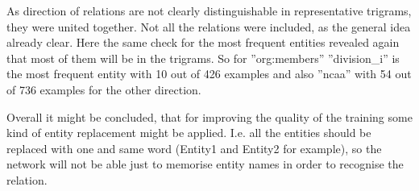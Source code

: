 As direction of relations are not clearly distinguishable in representative trigrams, they were 
united together. Not all the relations were included, as the general idea already clear. Here the same check for the most frequent entities revealed again that most of them will be in the trigrams. So for ''org:members'' ''division\_i'' is the most frequent entity with 10 out of 426 examples and also ''ncaa'' with 54 out of 736 examples for the other direction.

Overall it might be concluded, that for improving the quality of the training some kind of entity replacement might be applied. I.e. all the entities should be replaced with one and same word (Entity1 and Entity2 for example), so the network will not be able just to memorise entity names in order to recognise the relation.

